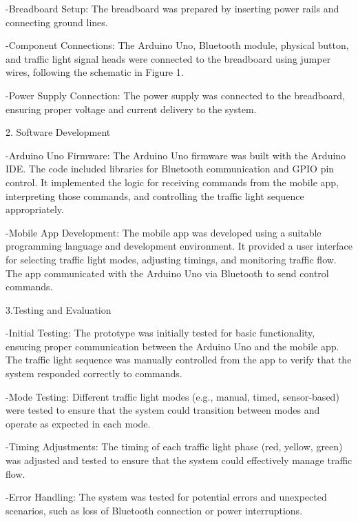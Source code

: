 \documentclass[conference, onecolumn]{IEEEtran}
\begin{document}
-Breadboard Setup: The breadboard was prepared by inserting power rails and connecting ground lines.\par

-Component Connections: The Arduino Uno, Bluetooth module, physical button, and traffic light signal heads were connected to the breadboard using jumper wires, following the schematic in Figure 1.\par

-Power Supply Connection: The power supply was connected to the breadboard, ensuring proper voltage and current delivery to the system.\par

2. Software Development\par

-Arduino Uno Firmware: The Arduino Uno firmware was built with the Arduino IDE. The code included libraries for Bluetooth communication and GPIO pin control. It implemented the logic for receiving commands from the mobile app, interpreting those commands, and controlling the traffic light sequence appropriately.\par

-Mobile App Development: The mobile app was developed using a suitable programming language and development environment. It provided a user interface for selecting traffic light modes, adjusting timings, and monitoring traffic flow. The app communicated with the Arduino Uno via Bluetooth to send control commands.\par

3.Testing and Evaluation\par

-Initial Testing: The prototype was initially tested for basic functionality, ensuring proper communication between the Arduino Uno and the mobile app. The traffic light sequence was manually controlled from the app to verify that the system responded correctly to commands.\par

-Mode Testing: Different traffic light modes (e.g., manual, timed, sensor-based) were tested to ensure that the system could transition between modes and operate as expected in each mode.\par

-Timing Adjustments: The timing of each traffic light phase (red, yellow, green) was adjusted and tested to ensure that the system could effectively manage traffic flow.\par

-Error Handling: The system was tested for potential errors and unexpected scenarios, such as loss of Bluetooth connection or power interruptions.\par
\end{document}
